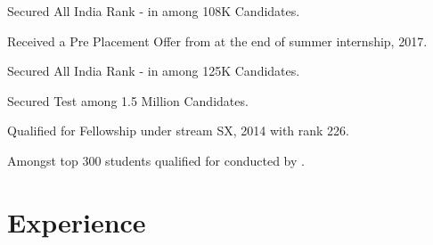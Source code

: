 \documentclass[a4paper]{norm-resume}
\begin{document}
\vspace{3mm} %

\begin{tightitemize}
    \item Secured All India Rank -  in {} among 108K Candidates.
    \item Received a Pre Placement Offer from {} at the end of summer internship, 2017.
    \item Secured All India Rank -  in {} among 125K Candidates.
    \item Secured  Test among 1.5 Million Candidates.
    \item Qualified for  Fellowship under stream SX, 2014 with rank 226.
    \item Amongst top 300 students qualified for  conducted by .
\end{tightitemize}


\vspace{0mm}    %


\section{Experience \hrulefill}

\vspace{1mm} %
 

\vspace{-1mm}

  
\iffalse
\begin{tightitemize}
        \small{
        \item Introductory course for Programming with 450 students enrolled. Conducting tutorials every week for a batch of 35 students.
        \item Assisting the instructor to design problems for quizzes, lab assignments, lab and theory exams.
        }
\end{tightitemize}
\vspace{5mm}
\fi
\end{document}
